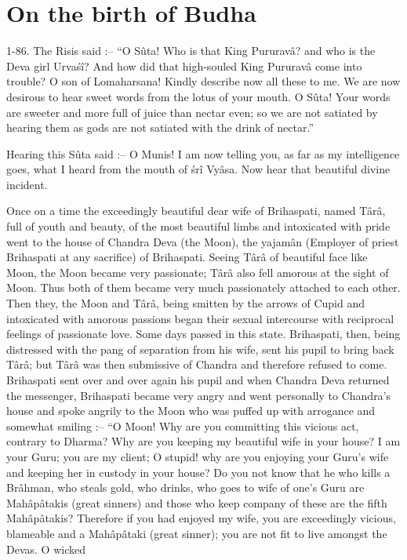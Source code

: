 \chapter{On the birth of Budha}

1-86. The Risis said :-- ``O S\^uta! Who is that King Pururav\^a? and who is the Deva girl Urva\'s\^i? And how did that high-souled King Pururav\^a come into trouble? O son of Lomaharsana! Kindly describe now all these to me. We are now desirous to hear sweet words from the lotus of your mouth. O S\^uta! Your words are sweeter and more full of juice than nectar even; so we are not satiated by hearing them as gods are not satiated with the drink of nectar.''

Hearing this S\^uta said :-- O Munis! I am now telling you, as far as my intelligence goes, what I heard from the mouth of \'sr\^i Vy\^asa. Now hear that beautiful divine incident.

Once on a time the exceedingly beautiful dear wife of Brihaspati, named T\^ar\^a, full of youth and beauty, of the most beautiful limbs and intoxicated with pride went to the house of Chandra Deva (the Moon), the yajam\^an (Employer of priest Brihaspati at any sacrifice) of Brihaspati. Seeing T\^ar\^a of beautiful face like Moon, the Moon became very passionate; T\^ar\^a also fell amorous at the sight of Moon. Thus both of them became very much passionately attached to each other. Then they, the Moon and T\^ar\^a, being smitten by the arrows of Cupid and intoxicated with amorous passions began their sexual intercourse with reciprocal feelings of passionate love. Some days passed in this state. Brihaspati, then, being distressed with the pang of separation from his wife, sent his pupil to bring back T\^ar\^a; but T\^ar\^a was then submissive of Chandra and therefore refused to come. Brihaspati sent over and over again his pupil and when Chandra Deva returned the messenger, Brihaspati became very angry and went personally to Chandra's house and spoke angrily to the Moon who was puffed up with arrogance and somewhat smiling :-- ``O Moon! Why are you committing this vicious act, contrary to Dharma? Why are you keeping my beautiful wife in your house? I am your Guru; you are my client; O stupid! why are you enjoying your Guru's wife and keeping her in custody in your house? Do you not know that he who kills a Br\^ahman, who steals gold, who drinks, who goes to wife of one's Guru are Mah\^ap\^atakis (great sinners) and those who keep company of these are the fifth Mah\^ap\^atakis? Therefore if you had enjoyed my wife, you are exceedingly vicious, blameable and a Mah\^ap\^ataki (great sinner); you are not fit to live amongst the Devas. O wicked

